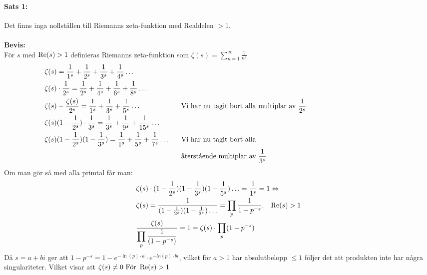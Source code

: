 \documentclass[a4paper]{article}%
\begin{document}
\paragraph{Sats 1:}
Det finns inga nollställen till Riemanns zeta-funktion med Realdelen $> 1$.\\
\\
{\bf Bevis:} \\
För $s$ med $\operatorname{Re}(s) > 1$ definieras Riemanns zeta-funktion som 
$\zeta(s) = \sum\limits_{n = 1}^\infty \frac {1} {n^s}$ 
\begin{equation}
	\begin{aligned}
		&\zeta(s) = \frac 1 {1^s} + \frac 1 {2^s} + \frac 1 {3^s} + \frac 1 {4^s} \ldots \notag\\
		&\zeta(s) \cdot \frac 1 {2^s} = \frac 1 {2^s} + \frac 1 {4^s} + \frac 1 {6^s} + \frac 1 {8^s} \ldots \\
		&\zeta(s) - \frac {\zeta(s)} {2^s} = \frac 1 {1^s} + \frac 1 {3^s} + \frac 1 {5^s} \ldots &
		\hspace{\width} &\text{Vi har nu tagit bort alla multiplar av } \frac 1 {2^s} \\
		&\zeta(s) (1 - \frac 1 {2^s}) \cdot \frac 1 {3^s} = \frac 1 {3^s} + \frac 1 {9^s} + \frac 1 {15^s} \ldots\\
		&\zeta(s)(1 - \frac 1 {2^s})(1 - \frac 1 {3^s}) = \frac 1 {1^s} + \frac 1 {5^s} + \frac 1 {7^s} \ldots &
		\hspace{\width} &\text{Vi har nu tagit bort alla} \\
		& & \hspace{\width} &\text{återstående multiplar av } \frac 1 {3^s} \\
	\end{aligned}
	\phantom{\hspace{4cm}}
\end{equation}
Om man gör så med alla primtal får man: 
\begin{equation}
	\begin{aligned}
		\notag
		&\zeta(s) \cdot (1 - \frac 1 {2^s})(1 - \frac 1 {3^s})(1 - \frac 1 {5^s}) \ldots = \frac 1 {1^s} = 1 \Leftrightarrow \\  
		&\zeta(s)  = \frac 1 {(1 - \frac 1 {2^s})(1 - \frac 1 {3^s})\ldots} = \prod_p \frac 1 {1 - p^{-s}}.\hspace{3mm} \operatorname{Re}(s) > 1 \\
		&\frac {\zeta(s)} {\displaystyle\prod_p \frac 1 {(1 - p^{-s})}} = 1 = \zeta(s) \cdot \prod_p (1 - p^{-s}) \\
	\end{aligned}
\end{equation}
Då $s = a+ bi$ ger att $1-p^{-s} = 1 - e^{-\ln(p) \cdot a} \cdot e^{-ln(p) \cdot bi}$, vilket för $a > 1$ har
absolutbelopp $\leq 1$ följer det att produkten inte har några singulariteter. 
Vilket visar att $\zeta(s) \ne 0 \text{ För } \operatorname{Re}(s) > 1$\\
\end{document}
